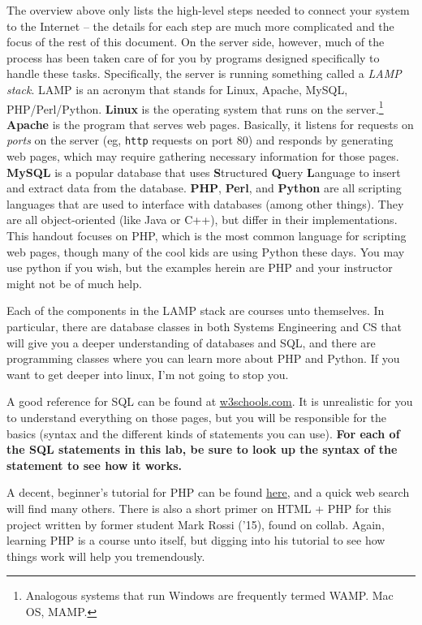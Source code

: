 \documentclass[11pt]{article} %
\begin{document}
The overview above only lists the high-level steps needed to connect your system to the Internet -- the details for each step are much more complicated and the focus of the rest of this document. On the server side, however, much of the process has been taken care of for you by programs designed specifically to handle these tasks. Specifically, the server is running something called a \emph{LAMP stack}. LAMP is an acronym that stands for Linux, Apache, MySQL, PHP/Perl/Python. {\bf Linux} is the operating system that runs on the server.\footnote{Analogous systems that run Windows are frequently termed WAMP. Mac OS, MAMP.} {\bf Apache} is the program that serves web pages. Basically, it listens for requests on \emph{ports} on the server (eg, \verb|http| requests on port 80) and responds by generating web pages, which may require gathering necessary information for those pages. {\bf MySQL} is a popular database that uses {\bf S}tructured {\bf Q}uery {\bf L}anguage to insert and extract data from the database. {\bf PHP}, {\bf Perl}, and {\bf Python} are all scripting languages that are used to interface with databases (among other things). They are all object-oriented (like Java or C++), but differ in their implementations. This handout focuses on PHP, which is the most common language for scripting web pages, though many of the cool kids are using Python these days. You may use python if you wish, but the examples herein are PHP and your instructor might not be of much help.

Each of the components in the LAMP stack are courses unto themselves. In particular, there are database classes in both Systems Engineering and CS that will give you a deeper understanding of databases and SQL, and there are programming classes where you can learn more about PHP and Python. If you want to get deeper into linux, I’m not going to stop you.

A good reference for SQL can be found at \href{http://www.w3schools.com/sql/default.asp}{\underline{w3schools.com}}. It is unrealistic for you to understand everything on those pages, but you will be responsible for the basics (syntax and the different kinds of statements you can use). {\bf For each of the SQL statements in this lab, be sure to look up the syntax of the statement to see how it works.}

A decent, beginner's tutorial for PHP can be found \href{http://devzone.zend.com/6/php-101-php-for-the-absolute-beginner/}{\underline{here}}, and a quick web search will find many others. There is also a short primer on HTML + PHP for this project written by former student Mark Rossi (’15), found on collab. Again, learning PHP is a course unto itself, but digging into his tutorial to see how things work will help you tremendously.
\end{document}
